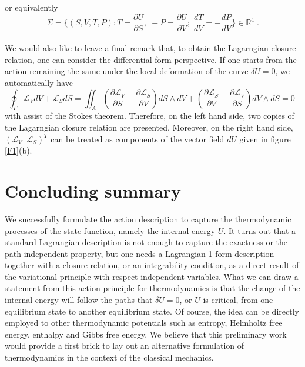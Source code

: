 \documentclass[12pt]{article}
\numberwithin{equation}{section}
\theoremstyle{remark}
\theoremstyle{definition}
\newcommand{\nn}{\nonumber}
\begin{document}
or equivalently
\begin{equation}
    \Sigma=\Big\{(S,V,T,P): T=\frac{\partial U}{\partial S},\; -P=\frac{\partial U}{\partial V};\; \frac{dT}{dV}=-\frac{dP}{dV}\Big\} \in \mathbb{R}^4\;.\nn
\end{equation}
\\
We would also like to leave a final remark that, to obtain the Lagarngian closure relation, one can consider the differential form perspective. If one starts from the action remaining the same under the local deformation of the curve $\delta U=0$, we automatically have
\begin{equation}
    \oint_\Gamma \mathcal{L}_VdV+\mathcal{L}_SdS=\iint_A\left(\frac{\partial \mathcal{L}_V}{\partial S}-\frac{\partial \mathcal{L}_S}{\partial V}\right)dS\wedge dV+\left(\frac{\partial \mathcal{L}_S}{\partial V}-\frac{\partial \mathcal{L}_V}{\partial S}\right)dV\wedge dS=0\;
\end{equation}
with assist of the Stokes theorem. Therefore, on the left hand side, two copies of the Lagarngian closure relation are presented. Moreover, on the right hand side, $(\mathcal{L}_V\;\;\mathcal{L}_S)^T$ can be treated as components of the vector field $dU$ given in figure \ref{F1}(b).



\section{Concluding summary}\label{SS}
We successfully formulate the action description to capture the thermodynamic processes of the state function, namely the internal energy $U$. It turns out that a standard Lagrangian description is not enough to capture the exactness or the path-independent property, but one needs a Lagrangian 1-form description together with a closure relation, or an integrability condition, as a direct result of the variational principle with respect independent variables. What we can draw a statement from this action principle for thermodynamics is that the change of the internal energy will follow the paths that $\delta U=0$, or $U$ is critical, from one equilibrium state to another equilibrium state. Of course, the idea can be directly employed to other thermodynamic potentials such as entropy, Helmholtz free energy, enthalpy and Gibbs free energy. We believe that this preliminary work would provide a first brick to lay out an alternative formulation of thermodynamics in the context of the classical mechanics.
\end{document}
